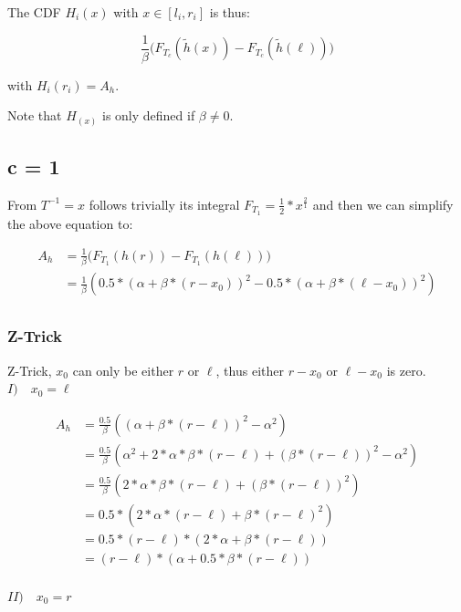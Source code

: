 \documentclass[]{article}
\begin{document}
The CDF $H_i(x)$ with $x \in [l_i, r_i]$ is thus:

\[ \frac{1}{\beta} \big( F_{T_c} (\tilde{h}(x)) - F_{T_c}(\tilde{h}(\ell)) \big) \]

with $H_i(r_i) = A_h$.


Note that $H_(x)$ is only defined if $\beta \neq 0$.

\subsection{c = 1}

From  $T^{-1} = x$ follows trivially its integral $F_{T_1} = \frac{1}{2} * x^{\frac{2}{1}}$
and then we can simplify the above equation to:

\begin{align*}
A_h &= \frac{1}{\beta} \big(F_{T_1}(h(r)) - F_{T_1}(h(\ell)) \big) \\
&= \frac{1}{\beta} \left(0.5 * (\alpha + \beta * (r - x_0))^2 - 0.5 * (\alpha + \beta * (\ell - x_0))^2 \right) \\
\end{align*}

\subsubsection{Z-Trick}

Z-Trick, $x_0$ can only be either $r$ or $\ell$, thus either $r - x_0$ or $\ell - x_0$ is zero. \\

\textbf{$I) \quad x_0 = \ell$}

\begin{align*}
A_h &= \frac{0.5}{\beta} \left( (\alpha + \beta * (r - \ell))^2 - \alpha^2  \right) \\
&= \frac{0.5}{\beta} \left( \alpha^2 + 2 * \alpha * \beta * (r - \ell) + (\beta * (r - \ell))^2 - \alpha^2  \right) \\
&= \frac{0.5}{\beta} \left( 2 * \alpha * \beta * (r - \ell) + (\beta * (r - \ell))^2 \right) \\
&= 0.5 * \left( 2 * \alpha * (r - \ell) + \beta * (r - \ell)^2 \right) \\
&= 0.5 * (r - \ell) * \left( 2 * \alpha  + \beta * (r - \ell) \right) \\
&= (r - \ell) * \left(\alpha  + 0.5 * \beta * (r - \ell) \right) \\
\end{align*}

\textbf{$II) \quad x_0 = r$}
\end{document}
